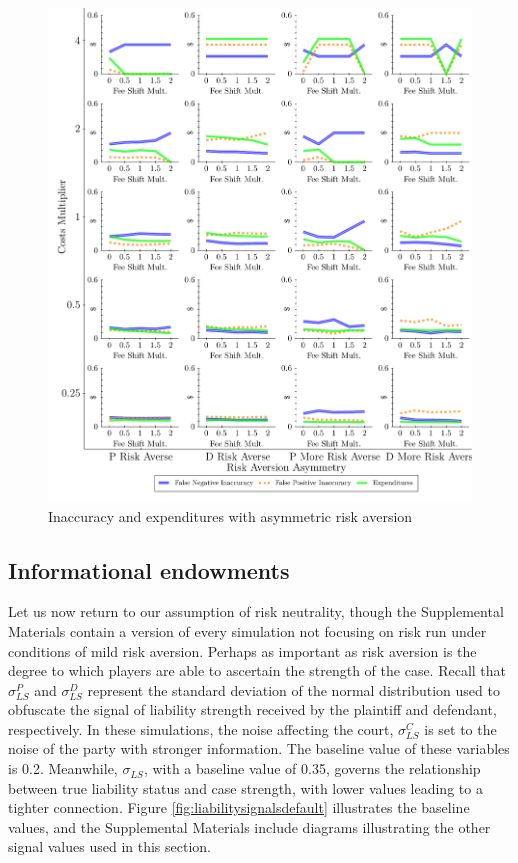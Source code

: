 \documentclass{article}
\begin{document}
\begin{figure}[h!]
\centering
\includegraphics[scale=0.50, trim={0in 0in 0in 0in}, clip]{../Figures/Accuracy and Expenditures Varying Risk Aversion Asymmetry.pdf}
\caption{Inaccuracy and expenditures with asymmetric risk aversion}
\label{fig:accexp_riskaversionasymmetry}
\end{figure}

\subsection{Informational endowments}

Let us now return to our assumption of risk neutrality, though the Supplemental Materials contain a version of every simulation not focusing on risk run under conditions of mild risk aversion. Perhaps as important as risk aversion is the degree to which players are able to ascertain the strength of the case. Recall that $\sigma_{LS}^P$ and $\sigma_{LS}^D$ represent the standard deviation of the normal distribution used to obfuscate the signal of liability strength received by the plaintiff and defendant, respectively. In these simulations, the noise affecting the court, $\sigma_{LS}^C$ is set to the noise of the party with stronger information. The baseline value of these variables is 0.2. Meanwhile, $\sigma_{LS}$, with a baseline value of 0.35, governs the relationship between true liability status and case strength, with lower values leading to a tighter connection. Figure \ref{fig:liabilitysignalsdefault} illustrates the baseline values, and the Supplemental Materials include diagrams illustrating the other signal values used in this section.
\end{document}
